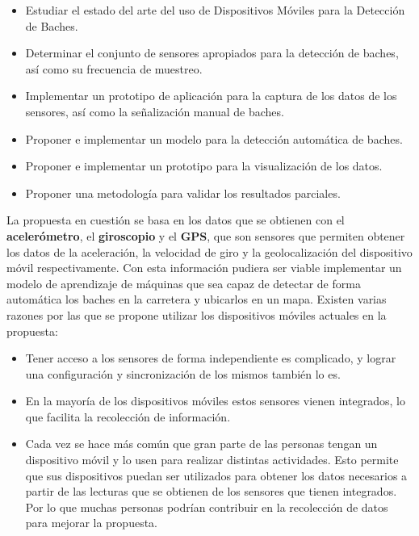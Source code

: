 \begin{itemize}
	\item Estudiar el estado del arte del uso de Dispositivos Móviles para la Detección de Baches.
	\item Determinar el conjunto de sensores apropiados para la detección de baches, así como su frecuencia de muestreo.
	\item Implementar un prototipo de aplicación para la captura de los datos de los sensores, así como la señalización
		manual de baches.
	\item Proponer e implementar un modelo para la detección automática de baches.
	\item Proponer e implementar un prototipo para la visualización de los datos.
	\item Proponer una metodología para validar los resultados parciales.
\end{itemize}

\indent La propuesta en cuestión se basa en los datos que se obtienen con el \textbf{acelerómetro}, el \textbf{giroscopio} y el \textbf{GPS}, que
son sensores que permiten obtener los datos de la aceleración, la velocidad de giro y la geolocalización del dispositivo móvil respectivamente.
Con esta información pudiera ser viable implementar un modelo de aprendizaje de máquinas que sea capaz de detectar de forma automática los baches
en la carretera y ubicarlos en un mapa. Existen varias razones por las que se propone utilizar los dispositivos móviles actuales en la propuesta:\\

\begin{itemize}
	\item Tener acceso a los sensores de forma independiente es complicado, y lograr una configuración y sincronización de los mismos también lo es.
	\item En la mayoría de los dispositivos móviles estos sensores vienen integrados, lo que facilita la recolección de información.
	\item Cada vez se hace más común que gran parte de las personas tengan un dispositivo móvil y lo usen para realizar distintas actividades.
		Esto permite que sus dispositivos puedan ser utilizados para obtener los datos necesarios a partir de las lecturas que se obtienen de los
		sensores que tienen integrados. Por lo que muchas personas podrían contribuir en la recolección de datos para mejorar la propuesta.
\end{itemize}
